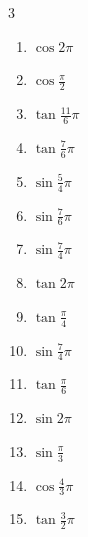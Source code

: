 \begin{multicols}{3}
\begin{enumerate}
  \item $\displaystyle \cos{2\pi}$
        \phantom{$\displaystyle =1$}

  \item $\displaystyle \cos{\frac{\pi}{2}}$
        \phantom{$\displaystyle =0$}

  \item $\displaystyle \tan{\frac{11}{6}\pi}$

  \item $\displaystyle \tan{\frac{7}{6}\pi}$

  \item $\displaystyle \sin{\frac{5}{4}\pi}$

  \item $\displaystyle \sin{\frac{7}{6}\pi}$

  \item $\displaystyle \sin{\frac{7}{4}\pi}$

  \item $\displaystyle \tan{2\pi}$
        \phantom{$\displaystyle =0$}

  \item $\displaystyle \tan{\frac{\pi}{4}}$
        \phantom{$\displaystyle =1$}

  \item $\displaystyle \sin{\frac{7}{4}\pi}$

  \item $\displaystyle \tan{\frac{\pi}{6}}$

\columnbreak %

  \item $\displaystyle \sin{2\pi}$
        \phantom{$\displaystyle =0$}

  \item $\displaystyle \sin{\frac{\pi}{3}}$

  \item $\displaystyle \cos{\frac{4}{3}\pi}$

  \item $\displaystyle \tan{\frac{3}{2}\pi}$
        \phantom{$\displaystyle \quad なし$}


\end{enumerate}
\end{multicols}
